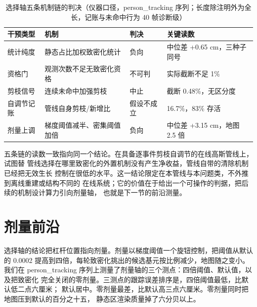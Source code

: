 \begin{table}[htbp]
\centering
\caption{选择轴五条机制链的判决（仪器口径，person\_tracking 序列；长度除注明外为全长，记账与未命中行为 40 帧诊断级）}
\label{tab:study3-chains}
\begin{tabular}{llll}
\toprule
干预类型 & 机制 & 判决 & 关键读数 \\
\midrule
统计纯度 & 静态占比加权致密化统计 & 负向 & 中位差 +0.65 cm，三种子同号 \\
资格门 & 观测次数不足无致密化资格 & 不可判 & 实际截断不足 1\% \\
剪枝信号 & 连续未命中加强剪枝 & 中止 & 截断 0.48\%，无区分度 \\
自调节记账 & 管线自身剪枝/新增比 & 假设不成立 & 16.7\%，83\% 存活 \\
剂量上调 & 梯度阈值减半、密集阈值加倍 & 负向 & 中位差 +3.15 cm，地图 2.5 倍 \\
\bottomrule
\end{tabular}
\end{table}

五条链的读数一致指向同一个结论。在具备逐事件剪枝自调节的在线高斯管线上，试图替
管线选择在哪里致密化的外置机制没有产生净收益，管线自带的清除机制已经把无效生长
控制在很低的水平。这一结论限定在本管线与本问题类，不外推到离线重建或结构不同的
在线系统；它的价值在于给出一个可操作的判据，把后续的机制设计算力引向剂量轴，
也就是下一节的前沿测量。

\section{剂量前沿}
\label{sec:study3-dose}

选择轴的结论把杠杆位置指向剂量。剂量以梯度阈值一个旋钮控制，把阈值从默认的
0.0002 提高到四倍，每轮致密化挑出的候选基元按比例减少，地图随之变小。我们在
person\_tracking 序列上测量了剂量轴的三个测点：四倍阈值、默认值，以及把致密化
完全关闭的零剂量。三测点的跟踪误差排序是，四倍阈值最低，比默认低二点六厘米；
默认居中。零剂量最差，比默认高三点六厘米。零剂量同时把地图压到默认的百分之十五，
静态区渲染质量掉了六分贝以上。

